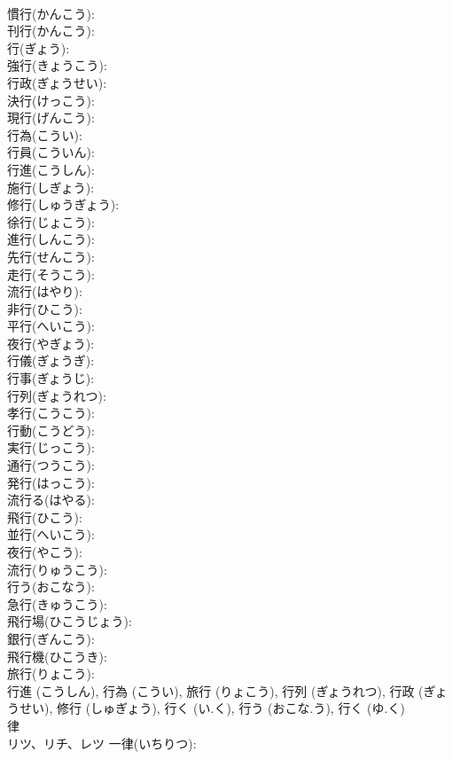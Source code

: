 \documentclass[8pt]{extreport}
\begin{document}
\begin{CJK}{UTF8}{min}
\\	慣行(かんこう): 
\\	刊行(かんこう): 
\\	行(ぎょう): 
\\	強行(きょうこう): 
\\	行政(ぎょうせい): 
\\	決行(けっこう): 
\\	現行(げんこう): 
\\	行為(こうい): 
\\	行員(こういん): 
\\	行進(こうしん): 
\\	施行(しぎょう): 
\\	修行(しゅうぎょう): 
\\	徐行(じょこう): 
\\	進行(しんこう): 
\\	先行(せんこう): 
\\	走行(そうこう): 
\\	流行(はやり): 
\\	非行(ひこう): 
\\	平行(へいこう): 
\\	夜行(やぎょう): 
\\	行儀(ぎょうぎ): 
\\	行事(ぎょうじ): 
\\	行列(ぎょうれつ): 
\\	孝行(こうこう): 
\\	行動(こうどう): 
\\	実行(じっこう): 
\\	通行(つうこう): 
\\	発行(はっこう): 
\\	流行る(はやる): 
\\	飛行(ひこう): 
\\	並行(へいこう): 
\\	夜行(やこう): 
\\	流行(りゅうこう): 
\\	行う(おこなう): 
\\	急行(きゅうこう): 
\\	飛行場(ひこうじょう): 
\\	銀行(ぎんこう): 
\\	飛行機(ひこうき): 
\\	旅行(りょこう): 
\\	行進 (こうしん), 行為 (こうい), 旅行 (りょこう), 行列 (ぎょうれつ), 行政 (ぎょうせい), 修行 (しゅぎょう), 行く (い.く), 行う (おこな.う), 行く (ゆ.く)
\\	律			
\\	リツ、リチ、レツ		一律(いちりつ): 

\end{CJK}
\end{document}
